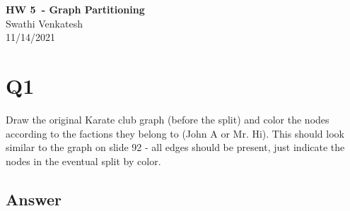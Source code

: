 \documentclass[12pt]{article}
\begin{document}
\begin{centering}
{\large\textbf{HW 5\ - Graph Partitioning}}\\ 
Swathi Venkatesh\\
11/14/2021\\
\end{centering}


\section*{Q1}
Draw the original Karate club graph (before the split) and color the nodes according to the factions they belong to (John A or Mr. Hi). This should look similar to the graph on slide 92 - all edges should be present, just indicate the nodes in the eventual split by color.

\subsection*{Answer}
\end{document}
